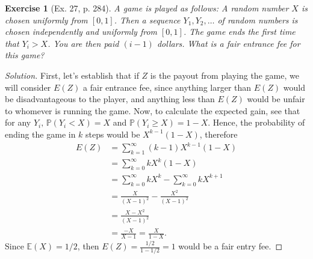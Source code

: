 \documentclass[letterpaper, 10 pt, conference]{article}
\newtheorem{ex}{Exercise}
\newcommand\E{\ensuremath{\mathbb{E}}}
\renewcommand{\P}{\ensuremath{\mathbb{P}}}
\begin{document}
\begin{ex}[Ex. 27, p. 284]
A game is played as follows: A random number $X$ is chosen uniformly from $[0,1]$. Then a sequence $Y_1, Y_2, \dots$ of random numbers is chosen independently and uniformly from $[0,1]$. The game ends the first time that $Y_i > X$. You are then paid $(i-1)$ dollars. What is a fair entrance fee for this game?
\end{ex}
\begin{proof}[Solution]
First, let's establish that if $Z$ is the payout from playing the game, we will consider $E(Z)$ a fair entrance fee, since anything larger than $E(Z)$ would be disadvantageous to the player, and anything less than $E(Z)$ would be unfair to whomever is running the game. Now, to calculate the expected gain, see that for any $Y_i, \, \P(Y_i < X) = X$ and $\P(Y_i \geq X) =  1-X$. Hence, the probability of ending the game in $k$ steps would be $X^{k-1} (1-X)$, therefore
\begin{align}
	E(Z) &= \sum_{k = 1}^{\infty} (k-1) X^{k-1}(1-X)\\
	&= \sum_{k = 0}^{\infty} k X^k(1-X) \\
	&=  \sum_{k = 0}^{\infty} k X^k -  \sum_{k = 0}^{\infty} k X^{k+1}\\
	&= \frac{X}{(X-1)^2} - \frac{X^2}{(X-1)^2}\\
	&= \frac{X - X^2}{(X-1)^2}\\
	&= \frac{-X}{X-1} = \frac{X}{1-X}.
\end{align}
Since $\E(X) = 1/2$, then $E(Z) = \frac{1/2}{1-1/2} = 1$ would be a fair entry fee.
\end{proof}



\end{document}
